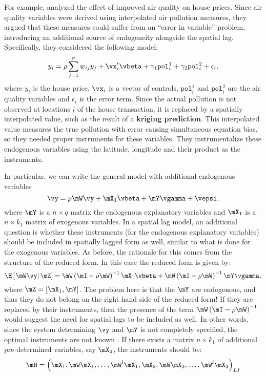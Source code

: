 For example, \cite{anselin2008errors} analyzed the effect of improved air quality on house prices. Since air quality variables were derived using interpolated air pollution measures, they argued that these measures could suffer from an ``error in variable'' problem, introducing an additional source of endogeneity alongside the spatial lag. Specifically, they considered the following model:
\begin{equation*}
  y_i = \rho \sum_{j = 1}^nw_{ij}y_j + \vx_i'\vbeta + \gamma_1\texttt{pol}_i^1 + \gamma_2\texttt{pol}_i^2 + \epsilon_i, 
\end{equation*}
%
where $y_i$ is the house price,  $\vx_i$ is a vector of controls,  $\texttt{pol}_i^1$ and $\texttt{pol}_i^2$ are the air quality variables and $\epsilon_i$ is the error term. Since the actual pollution is not observed at locations $i$ of the house transaction, it is replaced by a spatially interpolated value, such as the result of a \textbf{kriging prediction}. This interpolated value measures the true pollution with error causing simultaneous equation bias, so they needed proper instruments for these variables. They instrumentalize these endogenous variables using the latitude, longitude and their product as the instruments. 

In particular, we can write the general model with additional endogenous variables
\begin{equation*}
  \vy = \rho\mW\vy + \mX_1\vbeta + \mY\vgamma + \vepsi,
\end{equation*}
%
where $\mY$ is a $n\times q$ matrix the endogenous explanatory variables and $\mX_1$ is a $n\times k_1$ matrix of exogenous variables. In a spatial lag model, an additional question is whether these instruments (for the endogenous explanatory variables) should be included in spatially lagged form as well, similar to what is done for the exogenous variables. As before, the rationale for this comes from the structure of the reduced form.  In this case the reduced form is given by:
\begin{equation*}
\E\left[\left.\mW\vy\right|\mZ\right] = \mW\left(\mI - \rho\mW\right)^{-1}\mX_1\vbeta + \mW\left(\mI - \rho\mW\right)^{-1}\mY\vgamma,
\end{equation*}
%
where $\mZ = \left[\mX_1, \mY\right]$. The problem here is that the $\mY$ are endogenous, and thus they do not belong on the right hand side of the reduced form!  If they are replaced by their instruments, then the presence of the term $\mW\left(\mI - \rho\mW\right)^{-1}$ would suggest the need for spatial lags to be included as well. In other words, since the system determining $\vy$ and $\mY$ is not completely specified, the optimal instruments are not known \citep{spdep}. If there exists a matrix $n \times k_1$ of additional pre-determined variables, say $\mX_2$, the instruments should be:
\begin{equation}
\mH = \left(\mX_1, \mW\mX_1, \ldots, \mW^l\mX_1, \mX_2, \mW\mX_2, \ldots, \mW^l\mX_2\right)_{LI}
\end{equation}

